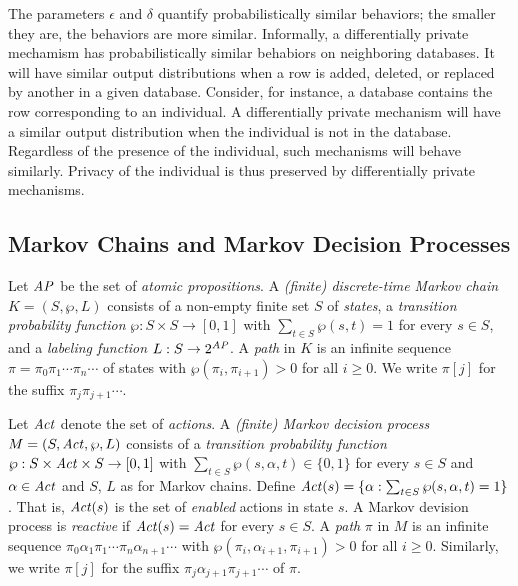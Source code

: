 The parameters $\epsilon$ and $\delta$ quantify probabilistically
similar behaviors; 
the smaller they are, the behaviors are more similar.
Informally, a differentially private mechamism has probabilistically
similar behabiors on neighboring databases. It will have similar
output distributions when a row is added, deleted, or replaced by
another in a given 
database. Consider, for instance, a database contains the row
corresponding to an individual. A differentially private mechanism
will have a similar output distribution when the individual is not in
the database. Regardless of the presence of the individual, such
mechanisms will behave similarly. Privacy of the individual is thus
preserved by differentially private mechanisms. 

\subsection{Markov Chains and Markov Decision Processes}

Let $\mathit{AP}$ be the set of \emph{atomic propositions}.
A \emph{(finite) discrete-time Markov chain} $K = (S, \wp, L)$ consists
of a non-empty finite set $S$ of \emph{states}, a \emph{transition
  probability function} $\wp : S \times S \rightarrow [0, 1]$ with
$\sum_{t \in S} \wp(s, t) = 1$ for every $s \in S$, and
a \emph{labeling function} $L : S \rightarrow 2^{\mathit{AP}}$. A \emph{path}
in $K$ is an infinite sequence $\pi = \pi_0 \pi_1 \cdots \pi_n \cdots$
of states with $\wp (\pi_i, \pi_{i+1}) > 0$ for all $i \geq 0$. We write
$\pi[j]$ for the suffix $\pi_j \pi_{j+1} \cdots$. %

Let $\mathit{Act}$ denote the set of \emph{actions}.
A \emph{(finite) Markov decision process} $M = (S, \mathit{Act}, \wp, L)$ consists
of a \emph{transition probability function} $\wp : S \times \mathit{Act}
\times S \rightarrow [0, 1]$ with $\sum_{t \in S} \wp(s, \alpha, t)
\in \{ 0, 1 \}$ for every $s \in S$ and $\alpha \in \mathit{Act}$ and $S$,
$L$ as for Markov chains. Define
$\mathit{Act}(s) = \{ \alpha : \sum_{t \in S} \wp (s, \alpha, t) = 1
\}$. That is, $\mathit{Act}(s)$ is the set of \emph{enabled} actions in state
$s$. A Markov devision process is \emph{reactive} if $\mathit{Act}(s) = \mathit{Act}$
for every $s \in S$.
A \emph{path} $\pi$ in $M$ is an infinite sequence $\pi_0 \alpha_1
\pi_1 \cdots \pi_n \alpha_{n+1} \cdots$ with 
$\wp(\pi_i, \alpha_{i+1}, \pi_{i+1}) > 0$ for all $i \geq 0$. 
Similarly, we write $\pi[j]$ for the suffix $\pi_j \alpha_{j+1}
\pi_{j+1} \cdots$ of $\pi$. 

